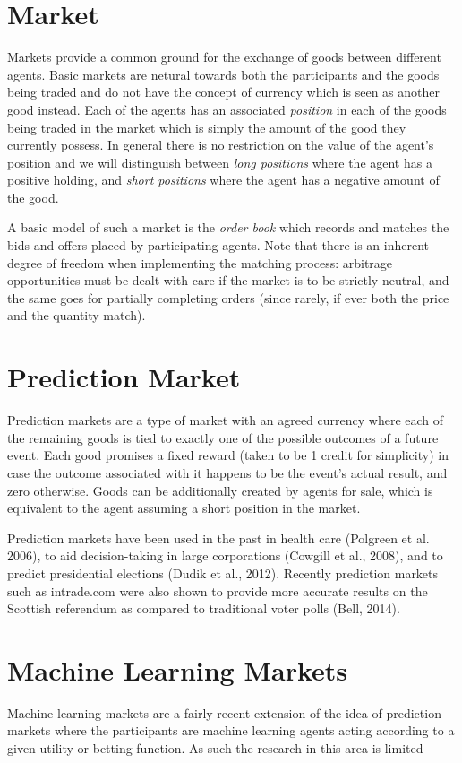 \documentclass[bsc,frontabs,twoside,singlespacing,parskip,deptreport]{infthesis}     %
\begin{document}
\section{Market}
	Markets provide a common ground for the exchange of goods between different agents. Basic markets are netural towards both the participants and the goods being traded and do not have the concept of currency which is seen as another good instead. Each of the agents has an associated {\em position} in each of the goods being traded in the market which is simply the amount of the good they currently possess. In general there is no restriction on the value of the agent's position and we will distinguish between {\em long positions} where the agent has a positive holding, and {\em short positions} where the agent has a negative amount of the good. 

	A basic model of such a market is the {\em order book} which records and matches the bids and offers placed by participating agents. Note that there is an inherent degree of freedom when implementing the matching process: arbitrage opportunities must be dealt with care if the market is to be strictly neutral, and the same goes for partially completing orders (since rarely, if ever both the price and the quantity match). 

\section{Prediction Market}
	Prediction markets are a type of market with an agreed currency where each of the remaining goods is tied to exactly one of the possible outcomes of a future event. Each good promises a fixed reward (taken to be 1 credit for simplicity) in case the outcome associated with it happens to be the event's actual result, and zero otherwise. Goods can be additionally created by agents for sale, which is equivalent to the agent assuming a short position in the market. 

	Prediction markets have been used in the past in health care (Polgreen et al. 2006), to aid decision-taking in large corporations (Cowgill et al., 2008), and to predict presidential elections (Dudik et al., 2012). Recently prediction markets such as intrade.com were also shown to provide more accurate results on the Scottish referendum as compared to traditional voter polls (Bell, 2014).

\section{Machine Learning Markets}
	Machine learning markets are a fairly recent extension of the idea of prediction markets where the participants are machine learning agents acting according to a given utility or betting function. As such the research in this area is limited
\end{document}
